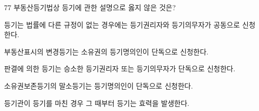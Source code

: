 \begin{question}{77}
부동산등기법상 등기에 관한 설명으로 옳지 않은 것은?
\begin{choices}
  \item 등기는 법률에 다른 규정이 없는 경우에는 등기권리자와 등기의무자가 공동으로 신청한다.
  \item 부동산표시의 변경등기는 소유권의 등기명의인이 단독으로 신청한다.
  \item 판결에 의한 등기는 승소한 등기권리자 또는 등기의무자가 단독으로 신청한다.
  \item 소유권보존등기의 말소등기는 등기명의인이 단독으로 신청한다.
  \item 등기관이 등기를 마친 경우 그 때부터 등기는 효력을 발생한다.
\end{choices}
\end{question}
